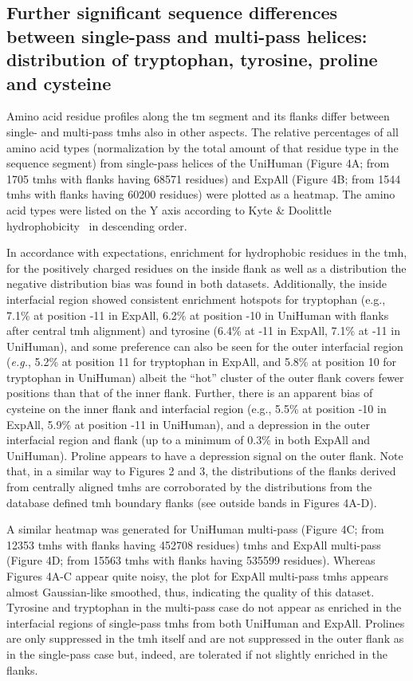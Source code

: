\subsection{Further significant sequence differences between single-pass and multi-pass helices: distribution of tryptophan, tyrosine, proline and cysteine}

Amino acid residue profiles along the \gls{tm} segment and its flanks differ between single- and multi-pass \gls{tmh}s also in other aspects. The relative percentages of all amino acid types (normalization by the total amount of that residue type in the sequence segment) from single-pass helices of the UniHuman (Figure 4A\@; from 1705 \gls{tmh}s with flanks having 68571 residues) and ExpAll (Figure 4B\@; from 1544 \gls{tmh}s with flanks having 60200 residues) were plotted as a heatmap. The amino acid types were listed on the Y axis according to Kyte \& Doolittle hydrophobicity~\cite{Kyte1982} in descending order.

In accordance with expectations, enrichment for hydrophobic residues in the \gls{tmh}, for the positively charged residues on the inside flank as well as a distribution the negative distribution bias was found in both datasets. Additionally, the inside interfacial region showed consistent enrichment hotspots for tryptophan (e.g., 7.1\% at position -11 in ExpAll, 6.2\% at position -10 in UniHuman with flanks after central \gls{tmh} alignment) and tyrosine (6.4\% at -11 in ExpAll, 7.1\% at -11 in UniHuman), and some preference can also be seen for the outer interfacial region (\textit{e.g.}, 5.2\% at position 11 for tryptophan in ExpAll, and 5.8\% at position 10 for tryptophan in UniHuman) albeit the “hot” cluster of the outer flank covers fewer positions than that of the inner flank. Further, there is an apparent bias of cysteine on the inner flank and interfacial region (e.g., 5.5\% at position -10 in ExpAll, 5.9\% at position -11 in UniHuman), and a depression in the outer interfacial region and flank (up to a minimum of 0.3\% in both ExpAll and UniHuman). Proline appears to have a depression signal on the outer flank. Note that, in a similar way to Figures 2 and 3, the distributions of the flanks derived from centrally aligned \gls{tmh}s are corroborated by the distributions from the database defined \gls{tmh} boundary flanks (see outside bands in Figures 4A-D).

A similar heatmap was generated for UniHuman multi-pass (Figure 4C\@; from 12353 \gls{tmh}s with flanks having 452708 residues) \gls{tmh}s and ExpAll multi-pass (Figure 4D\@; from 15563 \gls{tmh}s with flanks having 535599 residues). Whereas Figures 4A-C appear quite noisy, the plot for ExpAll multi-pass \gls{tmh}s appears almost Gaussian-like smoothed, thus, indicating the quality of this dataset. Tyrosine and tryptophan in the multi-pass case do not appear as enriched in the interfacial regions of single-pass \gls{tmh}s from both UniHuman and ExpAll. Prolines are only suppressed in the \gls{tmh} itself and are not suppressed in the outer flank as in the single-pass case but, indeed, are tolerated if not slightly enriched in the flanks.

